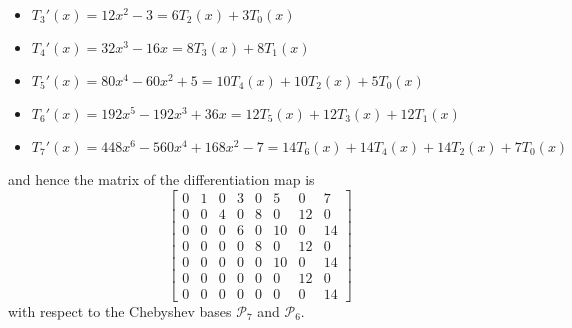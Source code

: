 \documentclass{../../../kin_math}
\begin{document}
\begin{questions}
\begin{enumerate}
\begin{solution}
\begin{itemize}
        \item $T_3'(x) = 12x^2 - 3 = 6T_2(x) + 3T_0(x)$
        \item $T_4'(x) = 32x^3 - 16x = 8T_3(x) + 8T_1(x)$
        \item $T_5'(x) = 80x^4 - 60x^2 + 5 = 10T_4(x) + 10T_2(x) + 5T_0(x)$
        \item $T_6'(x) = 192x^5 - 192x^3 + 36x = 12T_5(x) + 12T_3(x) + 12T_1(x)$
        \item $T_7'(x) = 448x^6 - 560x^4 + 168x^2 - 7 = 14T_6(x) + 14T_4(x) + 14T_2(x) + 7T_0(x)$
      \end{itemize}
      and hence the matrix of the differentiation map is
      \begin{equation*}
        \begin{bmatrix}
          0 & 1 & 0 & 3 & 0 & 5 & 0 & 7 \\
          0 & 0 & 4 & 0 & 8 & 0 & 12 & 0 \\
          0 & 0 & 0 & 6 & 0 & 10 & 0 & 14 \\
          0 & 0 & 0 & 0 & 8 & 0 & 12 & 0 \\
          0 & 0 & 0 & 0 & 0 & 10 & 0 & 14 \\
          0 & 0 & 0 & 0 & 0 & 0 & 12 & 0 \\
          0 & 0 & 0 & 0 & 0 & 0 & 0 & 14
        \end{bmatrix}
      \end{equation*}
      with respect to the Chebyshev bases $\mathcal{P}_7$ and $\mathcal{P}_6$.
    \end{solution}
  \end{enumerate}


\end{questions}
\end{document}
